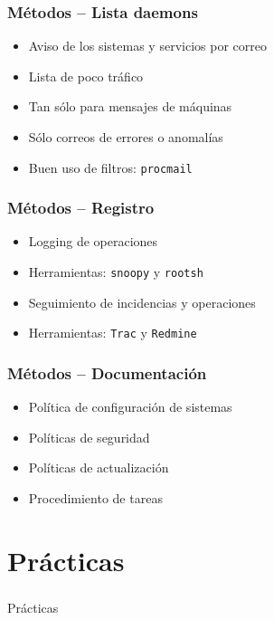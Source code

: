 \documentclass{beamer}
\begin{document}
\begin{frame}
  \frametitle{Métodos -- Lista daemons}
  \begin{itemize}
    \item Aviso de los sistemas y servicios por correo
    \item Lista de poco tráfico
    \item Tan sólo para mensajes de máquinas
    \item Sólo correos de errores o anomalías
    \item Buen uso de filtros: \texttt{procmail}
  \end{itemize}
\end{frame}

\begin{frame}
  \frametitle{Métodos -- Registro}
  \begin{itemize}
    \item Logging de operaciones
    \item Herramientas: \texttt{snoopy} y \texttt{rootsh}
  \end{itemize}
  \begin{itemize}
    \item Seguimiento de incidencias y operaciones
    \item Herramientas: \texttt{Trac} y \texttt{Redmine}
  \end{itemize}
\end{frame}

\begin{frame}
  \frametitle{Métodos -- Documentación}
  \begin{itemize}
    \item Política de configuración de sistemas
    \item Políticas de seguridad
    \item Políticas de actualización
    \item Procedimiento de tareas
  \end{itemize}
\end{frame}


\section{Prácticas}
\begin{frame}
  \frametitle{}
  \begin{center}
    \Huge Prácticas
  \end{center}
\end{frame}
\end{document}
